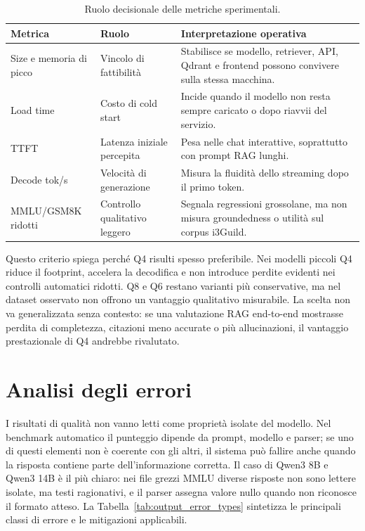 \begin{table}[ht]
  \centering
  \caption{Ruolo decisionale delle metriche sperimentali.}
  \label{tab:metric_decision_roles}
  \small
  \begin{tabularx}{\textwidth}{L{3.0cm}L{3.4cm}Y}
    \toprule
    \textbf{Metrica} & \textbf{Ruolo} & \textbf{Interpretazione operativa} \\
    \midrule
    Size e memoria di picco & Vincolo di fattibilità &
      Stabilisce se modello, retriever, API, Qdrant e frontend possono
      convivere sulla stessa macchina. \\
    Load time & Costo di cold start &
      Incide quando il modello non resta sempre caricato o dopo riavvii del
      servizio. \\
    TTFT & Latenza iniziale percepita &
      Pesa nelle chat interattive, soprattutto con prompt RAG lunghi. \\
    Decode tok/s & Velocità di generazione &
      Misura la fluidità dello streaming dopo il primo token. \\
    MMLU/GSM8K ridotti & Controllo qualitativo leggero &
      Segnala regressioni grossolane, ma non misura groundedness o utilità
      sul corpus i3Guild. \\
    \bottomrule
  \end{tabularx}
\end{table}

Questo criterio spiega perché Q4 risulti spesso preferibile. Nei modelli
piccoli Q4 riduce il footprint, accelera la decodifica e non introduce perdite
evidenti nei controlli automatici ridotti. Q8 e Q6 restano varianti più
conservative, ma nel dataset osservato non offrono un vantaggio qualitativo
misurabile. La scelta non va generalizzata senza contesto: se una valutazione
RAG end-to-end mostrasse perdita di completezza, citazioni meno accurate o più
allucinazioni, il vantaggio prestazionale di Q4 andrebbe rivalutato.

\section{Analisi degli errori}
\label{sec:evaluation_output_errors}

I risultati di qualità non vanno letti come proprietà isolate del modello. Nel
benchmark automatico il punteggio dipende da prompt, modello e parser; se uno di
questi elementi non è coerente con gli altri, il sistema può fallire anche quando
la risposta contiene parte dell'informazione corretta. Il caso di Qwen3 8B e
Qwen3 14B è il più chiaro: nei file grezzi MMLU diverse risposte non sono
lettere isolate, ma testi ragionativi, e il parser assegna valore nullo quando
non riconosce il formato atteso.
La Tabella~\ref{tab:output_error_types} sintetizza le principali classi di
errore e le mitigazioni applicabili.

